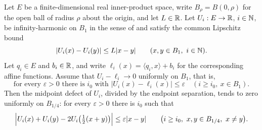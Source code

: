 \begin{theorem}
Let $E$ be a finite-dimensional real inner-product space, write $B_\rho=B(0,\rho)$
for the open ball of radius $\rho$ about the origin, and let $L\in\mathbb{R}$. Let
$U_i:E\to\mathbb{R}$, $i\in\mathbb{N}$, be infinity-harmonic on $B_1$ in the sense of
 and satisfy the common Lipschitz bound
\[
  |U_i(x)-U_i(y)|\le L|x-y|\qquad(x,y\in B_1,\ i\in\N).
\]
Let $q_i\in E$ and $b_i\in\mathbb{R}$, and write $\ell_i(x)=\langle q_i,x\rangle+b_i$ for
the corresponding affine functions. Assume that $U_i-\ell_i\to0$ uniformly on
$B_1$, that is,
\[
  \text{for every }\varepsilon>0\text{ there is }i_0\text{ with }
  |U_i(x)-\ell_i(x)|\le\varepsilon
  \quad(i\ge i_0,\ x\in B_1).
\]
Then the midpoint defect of $U_i$, divided by the endpoint separation, tends to
zero uniformly on $B_{1/4}$: for every $\varepsilon>0$ there is $i_0$ such that
\[
  \Bigl|U_i(x)+U_i(y)-2U_i\bigl(\tfrac12(x+y)\bigr)\Bigr|\le\varepsilon|x-y|
  \qquad\bigl(i\ge i_0,\ x,y\in B_{1/4},\ x\ne y\bigr).
\]
\end{theorem}
